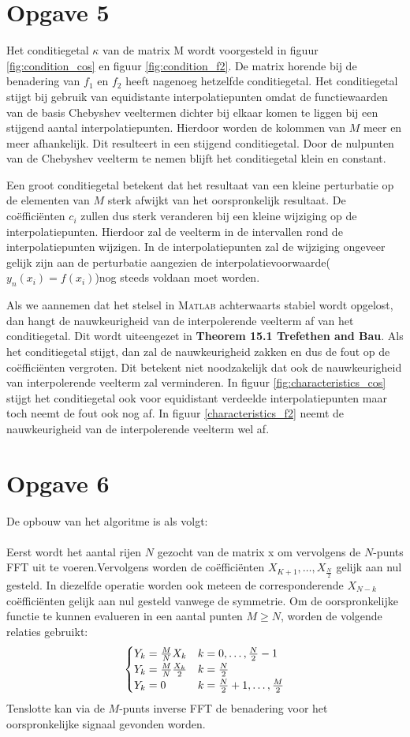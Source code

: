 \documentclass[a4paper]{article}
\newcommand{\opgave}[1]{\section*{Opgave #1}}
\begin{document}
\opgave{5}
Het conditiegetal $\kappa$ van de matrix M wordt voorgesteld in figuur \ref{fig:condition_cos} en figuur \ref{fig:condition_f2}. De matrix horende bij de benadering van $f_{1}$ en $f_{2}$ heeft nagenoeg hetzelfde conditiegetal. Het conditiegetal stijgt bij gebruik van equidistante interpolatiepunten omdat de functiewaarden van de basis Chebyshev veeltermen dichter bij elkaar komen te liggen bij een stijgend aantal interpolatiepunten. Hierdoor worden de kolommen van $M$ meer en meer afhankelijk. Dit resulteert in een stijgend conditiegetal. Door de nulpunten van de Chebyshev veelterm te nemen blijft het conditiegetal klein en constant.

Een groot conditiegetal betekent dat het resultaat van een kleine perturbatie op de elementen van $M$ sterk afwijkt van het oorspronkelijk resultaat. De co\"effici\"enten $c_{i}$ zullen dus sterk veranderen bij een kleine wijziging op de interpolatiepunten. Hierdoor zal de veelterm in de intervallen rond de interpolatiepunten wijzigen. In de interpolatiepunten zal de wijziging ongeveer gelijk zijn aan de perturbatie aangezien de interpolatievoorwaarde($y_{n}(x_{i}) = f(x_{i})$)nog steeds voldaan moet worden.

Als we aannemen dat het stelsel in \textsc{Matlab} achterwaarts stabiel wordt opgelost, dan hangt de nauwkeurigheid van de interpolerende veelterm af van het conditiegetal. Dit wordt uiteengezet in \textbf{Theorem 15.1 Trefethen and Bau}. Als het conditiegetal stijgt, dan zal de nauwkeurigheid zakken en dus de fout op de co\"effici\"enten vergroten. Dit betekent niet noodzakelijk dat ook de nauwkeurigheid van interpolerende veelterm zal verminderen. In figuur \ref{fig:characteristics_cos} stijgt het conditiegetal ook voor equidistant verdeelde interpolatiepunten maar toch neemt de fout ook nog af. In figuur \ref{characteristics_f2} neemt de nauwkeurigheid van de interpolerende veelterm wel af. 
\opgave{6}
De opbouw van het algoritme is als volgt:
\paragraph*{}
Eerst wordt het aantal rijen $N$ gezocht van de matrix x om vervolgens de $N$-punts FFT uit te voeren.Vervolgens worden de co\"{e}ffici\"{e}nten $X_{K+1}, \dots ,X_{\frac{N}{2}}$ gelijk aan nul gesteld. In diezelfde operatie worden ook meteen de corresponderende $X_{N-k}$ co\"{e}ffici\"{e}nten gelijk aan nul gesteld vanwege de symmetrie. Om de oorspronkelijke functie te kunnen evalueren in een aantal punten $M \geq N$, worden de volgende relaties gebruikt:
\begin{equation}
    \centering
        \begin{cases}
            Y_k=\frac{M}{N}X_k & k=0,\dots,\frac{N}{2}-1 \\
            Y_k=\frac{M}{N}\frac{X_k}{2} & k=\frac{N}{2} \\
            Y_k=0 & k=\frac{N}{2}+1,\dots,\frac{M}{2}
        \end{cases}
\end{equation}
Tenslotte kan via de $M$-punts inverse FFT de benadering voor het oorspronkelijke signaal gevonden worden.
\end{document}
